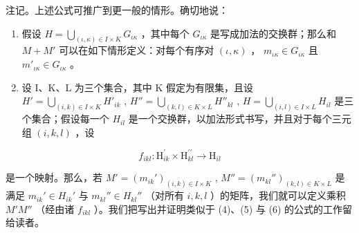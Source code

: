 注记。上述公式可推广到更一般的情形。确切地说：

\begin{enumerate}
\def\labelenumi{(\alph{enumi})}
\item
假设 \(H = \bigcup_{(\iota, \kappa) \in I \times K} G_{\iota\kappa}\) ，其中每个 \(G_{\iota\kappa}\) 是写成加法的交换群；那么和 \(M + M'\) 可以在如下情形定义：对每个有序对 \((\iota, \kappa)\) ， \(m_{\iota\kappa} \in G_{\iota\kappa}\) 且 \(m'_{\iota\kappa} \in G_{\iota\kappa}\) 。
\item
  设 I、K、L 为三个集合，其中 K 假定为有限集，且设 \(H' = \bigcup_{(i, k) \in I \times K} H'_{ik}\) , \(H'' = \bigcup_{(k, l) \in K \times L} H''_{kl}\) , \(H = \bigcup_{(i, l) \in I \times L} H_{il}\) 是三个集合；假设每一个 \(H_{il}\) 是一个交换群，以加法形式书写，并且对于每个三元组 \((i, k, l)\) ，设
\end{enumerate}

\[
f _ {i k l}: \mathrm{H} _ {i k} ^ {\prime} \times \mathrm{H} _ {k l} ^ {\prime \prime} \rightarrow \mathrm{H} _ {i l}
\]

是一个映射。那么，若 \(M' = (m_{ik}')_{(i,k) \in I \times K}\) , \(M'' = (m_{kl}'')_{(k,l) \in K \times L}\) 是满足 \(m_{ik}' \in H_{ik}'\) 与 \(m_{kl}'' \in H_{kl}''\) （对所有 \(i, k, l\) ）的矩阵，我们就可以定义乘积 \(M'M''\) （经由诸 \(f_{ikl}\) ）。我们把写出并证明类似于 (4)、(5) 与 (6) 的公式的工作留给读者。

